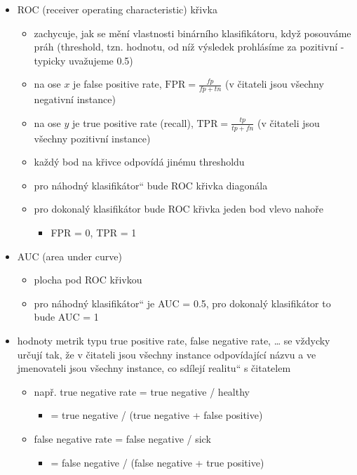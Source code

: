 \begin{itemize}
\begin{itemize}
\begin{itemize}
\item ROC (receiver operating characteristic) křivka
\begin{itemize}
\item zachycuje, jak se mění vlastnosti binárního klasifikátoru, když posouváme práh (threshold, tzn. hodnotu, od níž výsledek prohlásíme za pozitivní - typicky uvažujeme 0.5)
\item na ose $x$ je false positive rate, $\mathrm{FPR}=\frac{fp}{fp+tn}$ (v čitateli jsou všechny negativní instance)
\item na ose $y$ je true positive rate (recall), $\mathrm{TPR}=\frac{tp}{tp+fn}$ (v čitateli jsou všechny pozitivní instance)
\item každý bod na křivce odpovídá jinému thresholdu
\item pro náhodný \quotedblbase{}klasifikátor\textquotedblleft{} bude ROC křivka diagonála
\item pro dokonalý klasifikátor bude ROC křivka jeden bod vlevo nahoře
\begin{itemize}
\item FPR = 0, TPR = 1
\end{itemize}
\end{itemize}
\item AUC (area under curve)
\begin{itemize}
\item plocha pod ROC křivkou
\item pro náhodný \quotedblbase{}klasifikátor\textquotedblleft{} je AUC = 0.5, pro dokonalý klasifikátor to bude AUC = 1
\end{itemize}
\item hodnoty metrik typu true positive rate, false negative rate, \dots{} se vždycky určují tak, že v čitateli jsou všechny instance odpovídající názvu a ve jmenovateli jsou všechny instance, co sdílejí \quotedblbase{}realitu\textquotedblleft{} s čitatelem
\begin{itemize}
\item např. true negative rate = true negative / healthy
\begin{itemize}
\item = true negative / (true negative + false positive)
\end{itemize}
\item false negative rate = false negative / sick
\begin{itemize}
\item = false negative / (false negative + true positive)
\end{itemize}

\end{itemize}
\end{itemize}
\end{itemize}
\end{itemize}
